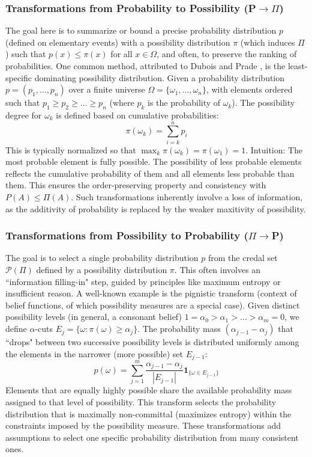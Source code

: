 \subsubsection{Transformations from Probability to Possibility (P$\to\Pi$)}
The goal here is to summarize or bound a precise probability distribution $p$ (defined on elementary events) with a possibility distribution $\pi$ (which induces $\Pi$) such that $p(x) \le \pi(x)$ for all $x \in \Omega$, and often, to preserve the ranking of probabilities.
One common method, attributed to Dubois and Prade \cite{Dubois1997}, is the least-specific dominating possibility distribution.
Given a probability distribution $p=(p_1, \dots, p_n)$ over a finite universe $\Omega = \{\omega_1, \dots, \omega_n\}$, with elements ordered such that $p_1 \ge p_2 \ge \dots \ge p_n$ (where $p_k$ is the probability of $\omega_k$). The possibility degree for $\omega_k$ is defined based on cumulative probabilities:
\[ \pi(\omega_k) = \sum_{i=k}^{n} p_i \]
This is typically normalized so that $\max_k \pi(\omega_k) = \pi(\omega_1) = 1$.
Intuition: The most probable element is fully possible. The possibility of less probable elements reflects the cumulative probability of them and all elements less probable than them. This ensures the order-preserving property and consistency with $P(A) \le \Pi(A)$. Such transformations inherently involve a loss of information, as the additivity of probability is replaced by the weaker maxitivity of possibility.

\subsubsection{Transformations from Possibility to Probability ($\Pi\to$P)}
The goal is to select a single probability distribution $p$ from the credal set $\mathcal{P}(\Pi)$ defined by a possibility distribution $\pi$. This often involves an ``information filling-in" step, guided by principles like maximum entropy or insufficient reason.
A well-known example is the pignistic transform (context of belief functions, of which possibility measures are a special case). Given distinct possibility levels (in general, a consonant belief) $1 = \alpha_0 > \alpha_1 > \dots > \alpha_m = 0$, we define $\alpha$-cuts $E_j = \{\omega : \pi(\omega) \ge \alpha_j\}$. The probability mass $(\alpha_{j-1} - \alpha_j)$ that ``drops" between two successive possibility levels is distributed uniformly among the elements in the narrower (more possible) set $E_{j-1}$:
\[ p(\omega) = \sum_{j=1}^{m} \frac{\alpha_{j-1} - \alpha_j}{|E_{j-1}|} \mathbf{1}_{\{\omega \in E_{j-1}\}} \]
Elements that are equally highly possible share the available probability mass assigned to that level of possibility. This transform selects the probability distribution that is maximally non-committal (maximizes entropy) within the constraints imposed by the possibility measure. These transformations add assumptions to select one specific probability distribution from many consistent ones.


